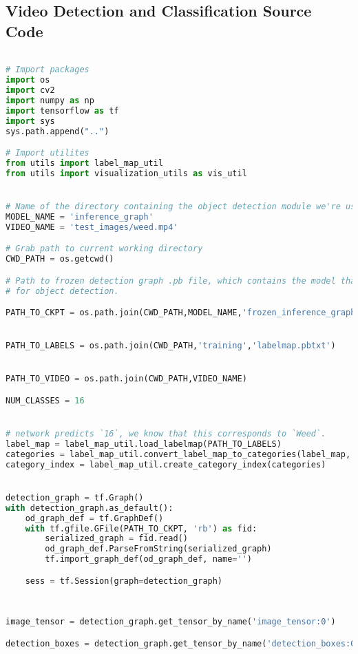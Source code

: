 \begin{appendices}

\chapter{Video Detection and Classification Source Code}

\begin{lstlisting}[language=Python, caption=Video Detection and Classification]

# Import packages
import os
import cv2
import numpy as np
import tensorflow as tf
import sys
sys.path.append("..")

# Import utilites
from utils import label_map_util
from utils import visualization_utils as vis_util


# Name of the directory containing the object detection module we're using
MODEL_NAME = 'inference_graph'
VIDEO_NAME = 'test_images/weed.mp4'

# Grab path to current working directory
CWD_PATH = os.getcwd()

# Path to frozen detection graph .pb file, which contains the model that is used
# for object detection.

PATH_TO_CKPT = os.path.join(CWD_PATH,MODEL_NAME,'frozen_inference_graph.pb')


PATH_TO_LABELS = os.path.join(CWD_PATH,'training','labelmap.pbtxt')


PATH_TO_VIDEO = os.path.join(CWD_PATH,VIDEO_NAME)

NUM_CLASSES = 16


# network predicts `16`, we know that this corresponds to `Weed`.
label_map = label_map_util.load_labelmap(PATH_TO_LABELS)
categories = label_map_util.convert_label_map_to_categories(label_map, max_num_classes=NUM_CLASSES, use_display_name=True)
category_index = label_map_util.create_category_index(categories)


detection_graph = tf.Graph()
with detection_graph.as_default():
	od_graph_def = tf.GraphDef()
	with tf.gfile.GFile(PATH_TO_CKPT, 'rb') as fid:
		serialized_graph = fid.read()
		od_graph_def.ParseFromString(serialized_graph)
		tf.import_graph_def(od_graph_def, name='')

	sess = tf.Session(graph=detection_graph)
	
	
	
image_tensor = detection_graph.get_tensor_by_name('image_tensor:0')

detection_boxes = detection_graph.get_tensor_by_name('detection_boxes:0')


\end{lstlisting}
\end{appendices}
